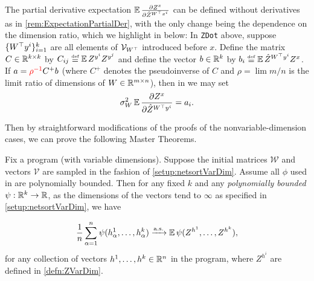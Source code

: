 \documentclass[main.tex]{subfiles}
\begin{document}
\begin{rem}\label{rem:ExpectationPartialDerVarDim}
    The partial derivative expectation $\operatorname*{\mathbb{E}}\frac{\partial Z^{x}}{\partial\hat{Z}^{W^{\top}x^{i}}}$ can be defined without derivatives as in \cref{rem:ExpectationPartialDer}, with the only change being the dependence on the dimension ratio, which we highlight in  below:
    In \texttt{ZDot} above, suppose $\{W^{\top}y^{i}\}_{i=1}^{k}$ are all elements of $\mathcal V_{W^\top}$ introduced before $x$.
    Define the matrix $C\in\mathbb{R}^{k\times k}$ by $C_{ij}\defeq \EV Z^{y^{i}}Z^{y^{j}}$ and define the vector $b\in\mathbb{R}^{k}$ by $b_{i}\defeq \EV\hat{Z}^{W^{\trsp}y^{i}}Z^{x}$. If $a={\color{red}\rho^{-1}}C^{+}b$ (where $C^{+}$ denotes the pseudoinverse of $C$ and $\rho=\lim m/n$ is the limit ratio of dimensions of $W\in\mathbb{R}^{m\times n}$), then in  we may set
    \begin{equation}
    \sigma_{W}^{2}\EV\frac{\partial Z^{x}}{\partial\hat{Z}^{W^{\trsp}y^{i}}}=a_{i}.\label{eq:ExpectationPartialDerNetsorT+}
    \end{equation}
\end{rem}

Then by straightforward modifications of the proofs of the nonvariable-dimension cases, we can prove the following Master Theorems.
\begin{thm}
\label{thm:NetsorTMasterTheoremVarDim} Fix a \netsort{} program (with variable dimensions). Suppose the initial matrices $\mathcal{W}$ and vectors $\mathcal{V}$ are sampled in the fashion of \cref{setup:netsortVarDim}.
Assume all $\phi$ used in  are polynomially bounded. Then for any fixed $k$ and any \emph{polynomially bounded} $\psi:\mathbb{R}^{k}\to\mathbb{R}$, as the dimensions of the vectors tend to $\infty$ as specified in \cref{setup:netsortVarDim}, we have

\[
\frac{1}{n}\sum_{\alpha=1}^{n}\psi(h_{\alpha}^{1},\ldots,h_{\alpha}^{k})\xrightarrow{\mathrm{a.s.}}\operatorname*{\mathbb{E}}\psi(Z^{h^{1}},\ldots,Z^{h^{k}}),
\]
for any collection of vectors $h^{1},\ldots,h^{k} \in \mathbb{R}^n$ in the program, where $Z^{h^{i}}$ are defined in \cref{defn:ZVarDim}.
\end{thm}
\end{document}
